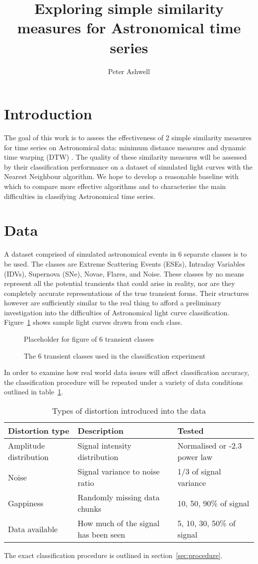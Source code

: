 \documentclass[10pt]{article}
\title{Exploring simple similarity measures for Astronomical time series}
\author{Peter Ashwell}
\date{}
\begin{document}
	\maketitle
	\section{Introduction}
	The goal of this work is to assess the effectiveness of 2 simple similarity measures for time series on Astronomical data: minimum distance measures and dynamic time warping (DTW) \citep{berndt1994using}. The quality of these similarity measures will be assessed by their classification performance on a dataset of simulated light curves with the Nearest Neighbour algorithm. We hope to develop a reasonable baseline with which to compare more effective algorithms and to characterise the main difficulties in classifying Astronomical time series.
	
	\section{Data}
	A dataset comprised of simulated astronomical events in 6 separate classes is to be used. The classes are Extreme Scattering Events (ESEs), Intraday Variables (IDVs), Supernova (SNe), Novae, Flares, and Noise. These classes by no means represent all the potential transients that could arise in reality, nor are they completely accurate representations of the true transient forms. Their structures however are sufficiently similar to the real thing to  afford a preliminary investigation into the difficulties of Astronomical light curve classification. Figure~\ref{fig:classes} shows sample light curves drawn from each class.
	
	\begin{figure}[ht!]
		\centering
		\label{fig:classes}
		Placeholder for figure of 6 transient classes
		\caption{The 6 transient classes used in the classification experiment}
	\end{figure}
	
	In order to examine how real world data issues will affect classification accuracy, the classification procedure will be repeated under a variety of data conditions outlined in table~\ref{tab:conditions}.
	
	\begin{table}[ht!]
	\centering
	\label{tab:conditions}
	\begin{tabular}{|l|l|l|} \hline
		Distortion type & Description & Tested \\ \hline
		Amplitude distribution & Signal intensity distribution & Normalised or -2.3 power law\\
		Noise & Signal variance to noise ratio & 1/3 of signal variance \\
		Gappiness & Randomly missing data chunks & 10, 50, 90\% of signal \\
		Data available & How much of the signal has been seen & 5, 10, 30, 50\% of signal \\ \hline
	\end{tabular}
	\caption{Types of distortion introduced into the data}
	\end{table}
	The exact classification procedure is outlined in section~\ref{sec:procedure}.
	
\end{document}
